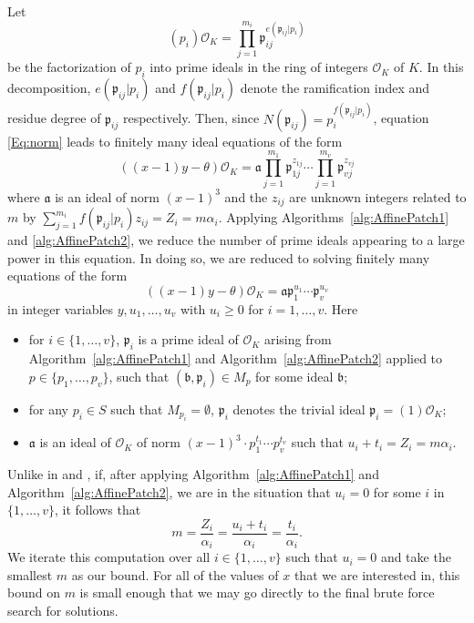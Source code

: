 Let 
\[(p_i)\mathcal{O}_K = \prod_{j = 1}^{m_i} \mathfrak{p}_{ij}^{e(\mathfrak{p}_{ij}|p_i)}\]
be the factorization of $p_i$ into prime ideals in the ring of integers $\mathcal{O}_K$ of $K$. In this decomposition, $e(\mathfrak{p}_{ij}|p_i)$ and $f(\mathfrak{p}_{ij}|p_i)$ denote the ramification index and residue degree of $\mathfrak{p}_{ij}$ respectively. Then, since $N(\mathfrak{p}_{ij}) = p_i^{f(\mathfrak{p}_{ij}|p_i)}$, equation \eqref{Eq:norm} leads to finitely many ideal equations of the form
\begin{equation} \label{Eq:ideals}
((x-1)y-\theta)\mathcal{O}_K = \mathfrak{a} \prod_{j = 1}^{m_1} \mathfrak{p}_{1j}^{z_{1j}} \cdots \prod_{j = 1}^{m_v} \mathfrak{p}_{vj}^{z_{vj}}
\end{equation}
where $\mathfrak{a}$ is an ideal of norm $(x-1)^3$ and the $z_{ij}$ are unknown integers related to $m$ by $\sum_{j = 1}^{m_i} f(\mathfrak{p}_{ij}|p_i)z_{ij} = Z_i = m \alpha_i$. 
Applying Algorithms~\ref{alg:AffinePatch1} and \ref{alg:AffinePatch2}, we reduce the number of prime ideals appearing to a large power in this equation. In doing so, we are reduced to solving finitely many equations of the form
\begin{equation}\label{Eq:TMfactored}
((x-1) y- \theta)\mathcal{O}_K=\mathfrak{a} \mathfrak{p}_1^{u_1}\cdots \mathfrak{p}_v^{u_v}
\end{equation}
in integer variables $y,u_1, \dots, u_v$ with $u_i \geq 0$ for $i = 1, \dots, v$. 
Here
\begin{itemize}
\item for $i \in \{1, \dots, v\}$, $\mathfrak{p}_i$ is a prime ideal of $\mathcal{O}_K$ arising from 
Algorithm~\ref{alg:AffinePatch1} and Algorithm~\ref{alg:AffinePatch2} applied to $p \in \{p_1, \dots, p_v\}$, such that $(\mathfrak{b}, \mathfrak{p}_i) \in M_p$ for some ideal $\mathfrak{b}$;
\item for any $p_i \in S$ such that $M_{p_i} = \emptyset$, $\mathfrak{p}_i$ denotes the trivial ideal $\mathfrak{p}_i = (1)\mathcal{O}_K$;
\item $\mathfrak{a}$ is an ideal of $\mathcal{O}_K$ of norm $(x-1)^3\cdot p_1^{t_1} \cdots p_v^{t_v}$ such that
$u_i + t_i =  Z_i = m\alpha_i$.
\end{itemize}

\begin{remark}\label{rem:uv}
Unlike in \cite{TW3}  and \cite{GhKaMaSi}, if, after applying Algorithm~\ref{alg:AffinePatch1} and Algorithm~\ref{alg:AffinePatch2}, we are in the situation that $u_i = 0$ for some $i$ in $\{1, \dots, v\}$, it follows that
\[m = \frac{Z_i}{\alpha_i } =  \frac{u_i + t_i}{\alpha_i } = \frac{t_i}{\alpha_i }.\]
We iterate this computation over all $i \in \{1, \dots, v\}$ such that $u_i = 0$ and take the smallest $m$ as our bound. For all of the values of $x$ that we are interested in, this bound on $m$ is small enough that we may go directly to the final brute force search for solutions.
\end{remark}

